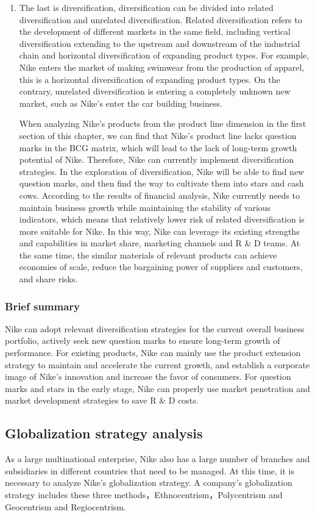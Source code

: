 \documentclass[a4paper, 12pt]{report}
\begin{document}
\begin{enumerate}
\item {The last is diversification, diversification can be divided into related diversification and unrelated diversification. Related diversification refers to the development of different markets in the same field, including vertical diversification extending to the upstream and downstream of the industrial chain and horizontal diversification of expanding product types. For example, Nike enters the market of making swimwear from the production of apparel, this is a horizontal diversification of expanding product types. On the contrary, unrelated diversification is entering a completely unknown new market, such as Nike's enter the car building business.\par
When analyzing Nike's products from the product line dimension in the first section of this chapter, we can find that Nike's product line lacks question marks in the BCG matrix, which will lead to the lack of long-term growth potential of Nike. Therefore, Nike can currently implement diversification strategies. In the exploration of diversification, Nike will be able to find new question marks, and then find the way  to cultivate them into stars and cash cows. According to the results of financial analysis, Nike currently needs to maintain business growth while maintaining the stability of various indicators, which means that relatively lower risk of related diversification is more suitable for Nike. In this way, Nike can leverage its existing strengths and capabilities in market share, marketing channels and R & D teams. At the same time, the similar materials of relevant products can achieve economies of scale, reduce the bargaining power of suppliers and customers, and share risks.}
\end{enumerate}
\subsubsection{Brief summary}
Nike can adopt relevant diversification strategies for the current overall business portfolio, actively seek new question marks to ensure long-term growth of performance. For existing products, Nike can mainly use the product extension strategy to maintain and accelerate the current growth, and establish a corporate image of Nike's innovation and increase the favor of consumers. For question marks and stars in the early stage, Nike can properly use market penetration and market development strategies to save R & D costs.
\subsection{Globalization strategy analysis}
As a large multinational enterprise, Nike also has a large number of branches and subsidiaries in different countries that need to be managed. At this time, it is necessary to analyze Nike's globalization strategy. A company's globalization strategy includes these three methods，Ethnocentrism，Polycentrism and Geocentrism and Regiocentrism.
\end{document}
